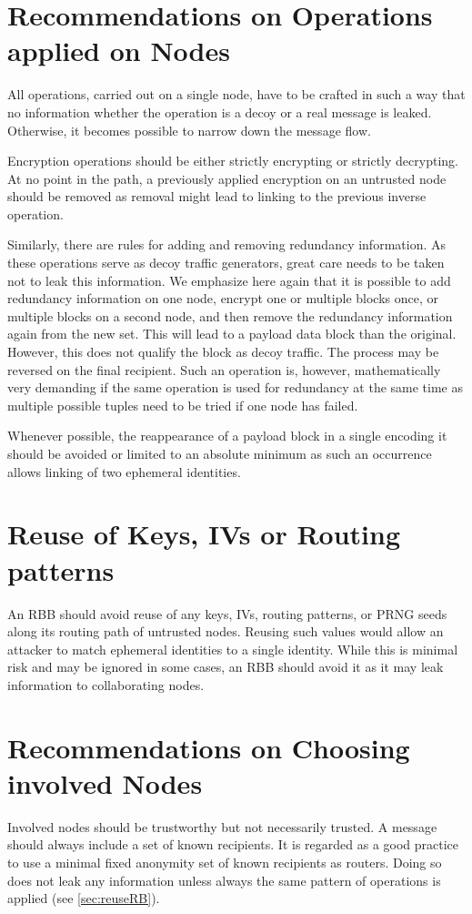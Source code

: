 \section{Recommendations on Operations applied on Nodes}
All operations, carried out on a single node, have to be crafted in such a way that no information whether the operation is a decoy or a real message is leaked. Otherwise, it becomes possible to narrow down the message flow.

Encryption operations should be either strictly encrypting or strictly decrypting. At no point in the path, a previously applied encryption on an untrusted node should be removed as removal might lead to linking to the previous inverse operation.

Similarly, there are rules for adding and removing redundancy information. As these operations serve as decoy traffic generators, great care needs to be taken not to leak this information. We emphasize here again that it is possible to add redundancy information on one node, encrypt one or multiple blocks once, or multiple blocks on a second node, and then remove the redundancy information again from the new set. This will lead to a payload data block than the original. However, this does not qualify the block as decoy traffic. The process may be reversed on the final recipient. Such an operation is, however, mathematically very demanding if the same operation is used for redundancy at the same time as multiple possible tuples need to be tried if one node has failed.

Whenever possible, the reappearance of a payload block in a single encoding it should be avoided or limited to an absolute minimum as such an occurrence allows linking of two ephemeral identities.

\section{Reuse of Keys, IVs or Routing patterns}
An RBB should avoid reuse of any keys, IVs, routing patterns, or PRNG seeds along its routing path of untrusted nodes. Reusing such values would allow an attacker to match ephemeral identities to a single identity. While this is minimal risk and may be ignored in some cases, an RBB should avoid it as it may leak information to collaborating nodes.

\section{Recommendations on Choosing involved Nodes}
Involved nodes should be trustworthy but not necessarily trusted. A message should always include a set of known recipients. It is regarded as a good practice to use a minimal fixed anonymity set of known recipients as routers. Doing so does not leak any information unless always the same pattern of operations is applied (see \ref{sec:reuseRB}).

